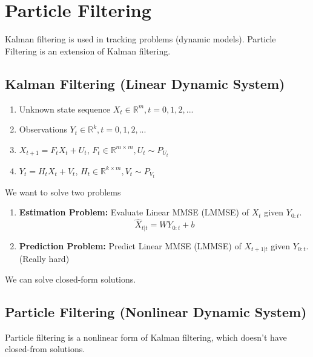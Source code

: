 \documentclass[11pt]{elegantbook}
\begin{document}
\chapter{Particle Filtering}
Kalman filtering is used in tracking problems (dynamic models). Particle Filtering is an extension of Kalman filtering.
\section{Kalman Filtering (Linear Dynamic System)}
\begin{enumerate}
    \item Unknown state sequence $X_t\in \mathbb{R}^m,t=0,1,2,...$
    \item Observations $Y_t\in \mathbb{R}^k,t=0,1,2,...$
    \item $X_{t+1}=F_tX_t+U_t$, $F_t\in \mathbb{R}^{m\times m}, U_t\sim P_{U_t}$
    \item $Y_t=H_tX_t+V_t$, $H_t\in \mathbb{R}^{k\times m}, V_t\sim P_{V_t}$
\end{enumerate}

We want to solve two problems
\begin{enumerate}
    \item \textbf{Estimation Problem:} Evaluate Linear MMSE (LMMSE) of $X_t$ given $Y_{0:t}$. $$\hat{X}_{t|t}=WY_{0:t}+b$$
    \item \textbf{Prediction Problem:} Predict Linear MMSE (LMMSE) of $X_{t+1|t}$ given $Y_{0:t}$. (Really hard)
\end{enumerate}
We can solve closed-form solutions.

\section{Particle Filtering (Nonlinear Dynamic System)}
Particle filtering is a nonlinear form of Kalman filtering, which doesn't have closed-from solutions.
\end{document}
